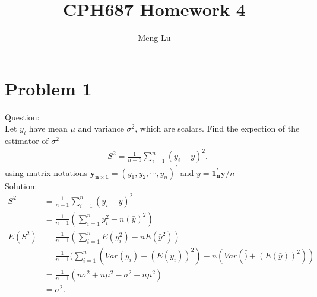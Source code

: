 \documentclass{article}
\begin{document}
 



\title{CPH687 Homework 4}
\author{\small{Meng Lu}}


\maketitle
\section{Problem 1}
Question: \\ 
Let $y_i$ have mean $\mu$ and variance $\sigma^2$, which are
scalars. Find the expection of the estimator of $\sigma^2$
\begin{align*}
  &S^2=\frac{1}{n-1}\sum_{i=1}^{n}(y_i-\bar{y})^2
  .
  \end{align*}
using matrix notations $\bm{y_{n\times
    1}}=(y_1,y_2,\cdots,y_n)^{\prime}$ and $\bar{y}=\bm{1_n^{\prime}y}/n$\\     
Solution:\\
\begin{align*}
  S^2&=\frac{1}{n-1}\sum_{i=1}^{n}(y_i-\bar{y})^2\\
  &=\frac{1}{n-1}(\sum_{i=1}^{n}y_i^2-n(\bar{y})^2)\\
  E(S^2)&=\frac{1}{n-1}(\sum_{i=1}^{n}E(y_i^2)-nE(\bar{y}^2))\\
  &=\frac{1}{n-1}(\sum_{i=1}^{n}(Var(y_i)+(E(y_i))^2)-n(Var(\bar)+(E(\bar{y}))^2))\\
  &=\frac{1}{n-1}(n\sigma^2+n\mu^2-\sigma^2-n\mu^2)\\
  &=\sigma^2 
  .
  \end{align*}
                
\end{document}
